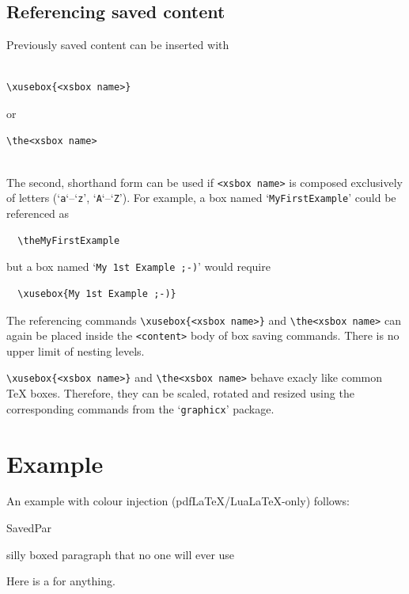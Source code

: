 \documentclass[a4paper]{article}
\begin{document}
\subsection*{Referencing saved content}
Previously saved content can be inserted with\\[-1.6\baselineskip]

\hrulefill\\[-1.6\baselineskip]
\begin{Verbatim}
\xusebox{<xsbox name>}
\end{Verbatim}
\vspace{-1ex}
or
\vspace{-1ex}
\begin{Verbatim}
\the<xsbox name>
\end{Verbatim}
\vspace{-1\baselineskip}
\hrulefill\\[-1\baselineskip]

The second, shorthand form can be used if \verb+<xsbox name>+ is composed exclusively of letters (`\verb+a+`--`\verb+z+', `\verb+A+`--`\verb+Z+'). For example, a box named `\verb+MyFirstExample+' could be referenced as
\begin{Verbatim}
  \theMyFirstExample
\end{Verbatim}
but a box named `\verb+My 1st Example ;-)+' would require
\begin{Verbatim}
  \xusebox{My 1st Example ;-)}
\end{Verbatim}

The referencing commands \verb+\xusebox{<xsbox name>}+ and \verb+\the<xsbox name>+ can again be placed inside the \verb+<content>+ body of box saving commands. There is no upper limit of nesting levels.

\verb+\xusebox{<xsbox name>}+ and \verb+\the<xsbox name>+ behave exacly like common \TeX{} boxes. Therefore, they can be scaled, rotated and resized using the corresponding commands from the `\verb+graphicx+' package.

\section{Example}
An example with colour injection (pdf\LaTeX/Lua\LaTeX-only) follows:

\begin{xlrbox*}{SavedPar}
  \begin{minipage}[b]{1in}
  silly boxed paragraph that no one will ever use
  \end{minipage}
\end{xlrbox*}%
Here is a \fbox{\color{blue}\theSavedPar} for anything.
\end{document}
